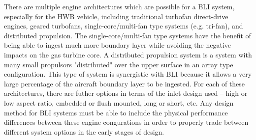 There are multiple engine architectures which are possible for a BLI system, especially for the HWB vehicle,  including traditional turbofan direct-drive engines, geared turbofans, single-core/multi-fan type systems (e.g. tri-fan), and distributed propulsion.  The single-core/multi-fan type systems have the benefit of being able to ingest much more boundary layer while avoiding the negative impacts on the gas turbine core.  A distributed propulsion system is a system with many small propulsors "distributed" over the upper surface in an array type configuration.  This type of system is synergistic with BLI because it allows a very large percentage of the aircraft boundary layer to be ingested. For each of these architectures, there are futher options in terms of the inlet design used -- high or low aspect ratio, embedded or flush mounted, long or short, etc.  Any design method for BLI systems must be able to include the physical performance differences between these engine congurations in order to properly trade between different system options in the early stages of design.


